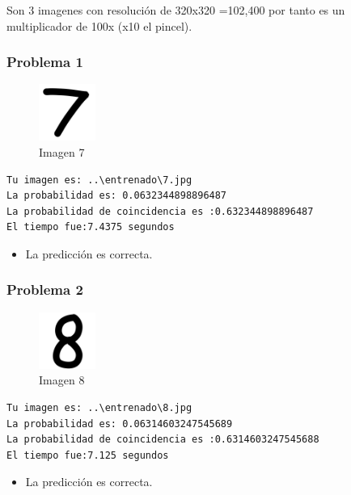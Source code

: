\documentclass[
  spanish,
]{article}
\providecommand{\tightlist}{%
  \setlength{\itemsep}{0pt}\setlength{\parskip}{0pt}}
\begin{document}
Son 3 imagenes con resolución de 320x320 =102,400 por tanto es un
multiplicador de 100x (x10 el pincel).

\hypertarget{problema-1-2}{%
\subsubsection{Problema 1}\label{problema-1-2}}

\begin{figure}
\centering
\includegraphics[width=0.72917in,height=\textheight]{documentacion/img/7.png}
\caption{Imagen 7}
\end{figure}

\begin{verbatim}
Tu imagen es: ..\entrenado\7.jpg
La probabilidad es: 0.0632344898896487
La probabilidad de coincidencia es :0.632344898896487
El tiempo fue:7.4375 segundos
\end{verbatim}

\begin{itemize}
\tightlist
\item
  La predicción es correcta.
\end{itemize}

\hypertarget{problema-2-2}{%
\subsubsection{Problema 2}\label{problema-2-2}}

\begin{figure}
\centering
\includegraphics[width=0.72917in,height=\textheight]{documentacion/img/8.png}
\caption{Imagen 8}
\end{figure}

\begin{verbatim}
Tu imagen es: ..\entrenado\8.jpg
La probabilidad es: 0.06314603247545689
La probabilidad de coincidencia es :0.6314603247545688
El tiempo fue:7.125 segundos
\end{verbatim}

\begin{itemize}
\tightlist
\item
  La predicción es correcta.
\end{itemize}
\end{document}
